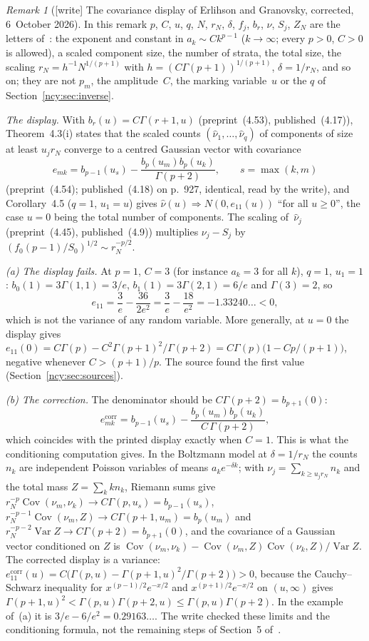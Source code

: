 \documentclass[11pt,letterpaper]{article}
\numberwithin{equation}{section}
\theoremstyle{remark}\newtheorem{remark}[theorem]{Remark}
\theoremstyle{definition}\newtheorem{definition}[theorem]{Definition}\theoremstyle{plain}
\begin{document}
\begin{remark}[{[write]} The covariance display of Erlihson and Granovsky, corrected, 6~October 2026]\label{ncy:rem:eg}
In this remark $p$, $C$, $u$, $q$, $N$, $r_N$, $\delta$, $f_j$, $b_r$,
$\nu$, $S_j$, $Z_N$ are the letters of~\cite{eg2008}: the exponent and
constant in $a_k\sim Ck^{p-1}$ ($k\to\infty$; every $p>0$, $C>0$ is allowed),
a scaled component size, the number of strata, the total size, the scaling
$r_N=h^{-1}N^{1/(p+1)}$ with $h=(C\Gamma(p+1))^{1/(p+1)}$, $\delta=1/r_N$,
and so on; they are not $p_m$, the amplitude~$C$, the marking variable~$u$
or the $q$ of Section~\ref{ncy:sec:inverse}.

\emph{The display.} With $b_r(u)=C\Gamma(r+1,u)$ (preprint~(4.53),
published~(4.17)), Theorem~4.3(i) states that the scaled counts
$(\hat\nu_1,\dots,\hat\nu_q)$ of components of size at least $u_jr_N$
converge to a centred Gaussian vector with covariance
\[
 e_{mk}=b_{p-1}(u_s)-\frac{b_p(u_m)b_p(u_k)}{\Gamma(p+2)},\qquad s=\max(k,m)
\]
(preprint~(4.54); published~(4.18) on p.~927, identical, read by the write),
and Corollary~4.5 ($q=1$, $u_1=u$) gives $\hat\nu(u)\Rightarrow N(0,e_{11}(u))$
``for all $u\ge0$'', the case $u=0$ being the total number of components.
The scaling of~$\hat\nu_j$ (preprint~(4.45), published~(4.9)) multiplies
$\nu_j-S_j$ by $(f_0(p-1)/S_0)^{1/2}\sim r_N^{-p/2}$.

\emph{(a) The display fails.} At $p=1$, $C=3$ (for instance $a_k=3$ for all
$k$), $q=1$, $u_1=1$: $b_0(1)=3\Gamma(1,1)=3/e$, $b_1(1)=3\Gamma(2,1)=6/e$
and $\Gamma(3)=2$, so
\[
 e_{11}=\frac3e-\frac{36}{2e^2}=\frac3e-\frac{18}{e^2}=-1.33240\ldots<0,
\]
which is not the variance of any random variable. More generally, at $u=0$
the display gives
$e_{11}(0)=C\Gamma(p)-C^2\Gamma(p+1)^2/\Gamma(p+2)=C\Gamma(p)\bigl(1-Cp/(p+1)\bigr)$,
negative whenever $C>(p+1)/p$. The source found the first value (Section~\ref{ncy:sec:sources}).

\emph{(b) The correction.} The denominator should be
$C\Gamma(p+2)=b_{p+1}(0)$:
\[
 e^{\mathrm{corr}}_{mk}=b_{p-1}(u_s)-\frac{b_p(u_m)b_p(u_k)}{C\,\Gamma(p+2)},
\]
which coincides with the printed display exactly when $C=1$. This is what the
conditioning computation gives. In the Boltzmann model at $\delta=1/r_N$ the
counts $n_k$ are independent Poisson variables of means $a_ke^{-\delta k}$;
with $\nu_j=\sum_{k\ge u_jr_N}n_k$ and the total mass $Z=\sum_kkn_k$, Riemann
sums give
$r_N^{-p}\operatorname{Cov}(\nu_m,\nu_k)\to C\Gamma(p,u_s)=b_{p-1}(u_s)$,
$r_N^{-p-1}\operatorname{Cov}(\nu_m,Z)\to C\Gamma(p+1,u_m)=b_p(u_m)$ and
$r_N^{-p-2}\operatorname{Var}Z\to C\Gamma(p+2)=b_{p+1}(0)$, and the
covariance of a Gaussian vector conditioned on $Z$ is
$\operatorname{Cov}(\nu_m,\nu_k)-\operatorname{Cov}(\nu_m,Z)\operatorname{Cov}(\nu_k,Z)/\operatorname{Var}Z$.
The corrected display is a variance: $e^{\mathrm{corr}}_{11}(u)
=C\bigl(\Gamma(p,u)-\Gamma(p+1,u)^2/\Gamma(p+2)\bigr)>0$, because the
Cauchy--Schwarz inequality for $x^{(p-1)/2}e^{-x/2}$ and
$x^{(p+1)/2}e^{-x/2}$ on $(u,\infty)$ gives
$\Gamma(p+1,u)^2<\Gamma(p,u)\Gamma(p+2,u)\le\Gamma(p,u)\Gamma(p+2)$. In the
example of~(a) it is $3/e-6/e^2=0.29163\ldots$. The write checked these
limits and the conditioning formula, not the remaining steps of Section~5
of~\cite{eg2008}.


\end{remark}
\end{document}
